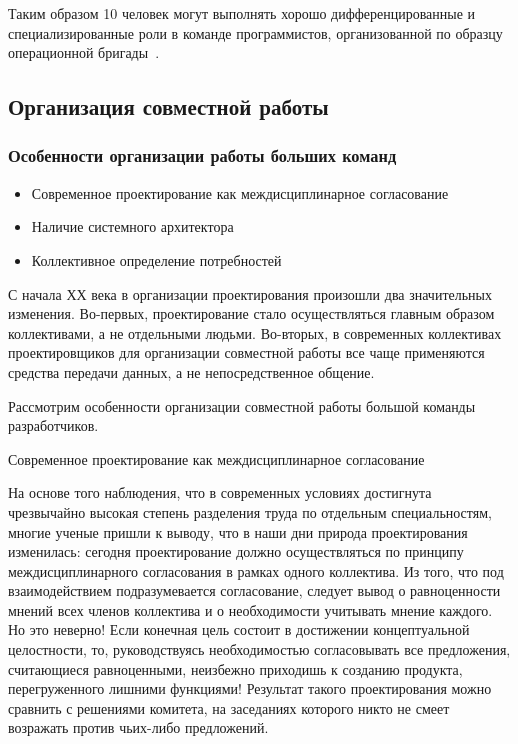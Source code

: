 \documentclass{../industrial-development}
\begin{document}
Таким образом 10 человек могут выполнять хорошо дифференцированные и специализированные роли в команде программистов, организованной по образцу операционной бригады~\cite[с.~23--26]{Brooks2000}.

\subsection{Организация совместной работы}

\begin{frame} \frametitle{Особенности организации работы больших команд}
    \begin{itemize}
     \item Современное проектирование как междисциплинарное согласование
     \item Наличие системного архитектора
     \item Коллективное определение потребностей
    \end{itemize}
\end{frame}

\lecturenotes

С начала ХХ века в организации проектирования произошли два значительных изменения. Во-первых, проектирование стало осуществляться главным образом коллективами, а не отдельными людьми. Во-вторых, в современных коллективах проектировщиков для организации совместной работы все чаще применяются средства передачи данных, а не непосредственное общение.

Рассмотрим особенности организации совместной работы большой команды разработчиков.

Современное проектирование как междисциплинарное согласование

На основе того наблюдения, что в современных условиях достигнута чрезвычайно высокая степень разделения труда по отдельным специальностям, многие ученые пришли к выводу, что в наши дни природа проектирования изменилась: сегодня проектирование должно осуществляться по принципу междисциплинарного согласования в рамках одного коллектива. Из того, что под взаимодействием подразумевается согласование, следует вывод о равноценности мнений всех членов коллектива и о необходимости учитывать мнение каждого. Но это неверно! Если конечная цель состоит в достижении концептуальной целостности, то, руководствуясь необходимостью согласовывать все предложения, считающиеся равноценными, неизбежно приходишь к созданию продукта, перегруженного лишними функциями! Результат такого проектирования можно сравнить с решениями комитета, на заседаниях которого никто не смеет возражать против чьих-либо предложений.
\end{document}
